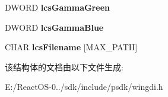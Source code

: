 \begin{DoxyCompactItemize}
\mbox{\label{structtag_l_o_g_c_o_l_o_r_s_p_a_c_e_a_a39c118584965563a95362df1e1595162}} 
D\+W\+O\+RD {\bfseries lcs\+Gamma\+Green}
\item 
\mbox{\label{structtag_l_o_g_c_o_l_o_r_s_p_a_c_e_a_ab8a3378b2891f51ea38f731807422e7d}} 
D\+W\+O\+RD {\bfseries lcs\+Gamma\+Blue}
\item 
\mbox{\label{structtag_l_o_g_c_o_l_o_r_s_p_a_c_e_a_a9fd3777c4cae0e1de6593450ad2190bc}} 
C\+H\+AR {\bfseries lcs\+Filename} \mbox{[}M\+A\+X\+\_\+\+P\+A\+TH\mbox{]}
\end{DoxyCompactItemize}


该结构体的文档由以下文件生成\+:\begin{DoxyCompactItemize}
\item 
E\+:/\+React\+O\+S-\/0../sdk/include/psdk/wingdi.\+h\end{DoxyCompactItemize}

